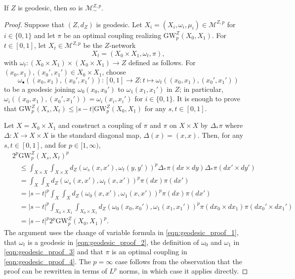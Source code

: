 \documentclass[twoside,11pt]{article}
\theoremstyle{definition}
\newcommand{\M}{\mathcal{M}}
\newcommand{\MZp}{\M_{\sim}^{Z,p}}
\newcommand{\dgwz}{\mathrm{GW}_p^Z}
\begin{document}
\begin{theorem}\label{thm:geodesic}
    If $Z$ is geodesic, then so is $\MZp$.
\end{theorem}
\begin{proof}
    Suppose that $(Z,d_Z)$ is geodesic. Let $X_i = (X_i,\omega_i,\mu_i) \in \M^{Z,p}$ for $i \in \{0,1\}$ and let $\pi$ be an optimal coupling realizing $\dgwz(X_0,X_1)$. For $t \in [0,1]$, let $X_t \in \M^{Z,p}$ be the $Z$-network
    \[
        X_t = (X_0 \times X_1, \omega_t, \pi),
    \]
    with $\omega_t:(X_0 \times X_1) \times (X_0 \times X_1) \to Z$ defined as follows. For $(x_0,x_1),(x_0',x_1') \in X_0 \times X_1$, choose
    \[
        \omega_\bullet ((x_0,x_1),(x_0',x_1')): [0,1] \to Z: t \mapsto \omega_t ((x_0,x_1),(x_0',x_1'))
    \]
    to be a geodesic joining $\omega_0(x_0,x_0')$ to $\omega_1(x_1,x_1')$ in $Z$; in particular, $\omega_i((x_0,x_1),(x_0',x_1')) = \omega_i(x_i,x_i')$ for $i \in \{0,1\}$. It is enough to prove that $\dgwz(X_s,X_t)\leq |s-t|\dgwz(X_0,X_1)$ for any $s,t\in [0,1]$. 
    
    


    Let $X = X_0\times X_1$ and construct a coupling of $\pi$ and $\pi$ on $X\times X$ by $\Delta_* \pi $ where $\Delta: X\to X\times X$ is the standard diagonal map, $\Delta(x)=(x,x)$. Then, for any $s,t\in [0,1]$, and for $p \in [1,\infty)$,
    \begin{align}
        &2^p\dgwz(X_s, X_t)^p \\
        &\quad \leq \int_{X\times X}\int_{X\times X}d_Z(\omega_s(x,x'), \omega_t(y,y'))^p\Delta_*\pi(dx\times dy)\Delta_*\pi(dx'\times dy')                      \\ &\quad= \int_{X}\int_{X}d_Z(\omega_s(x,x'), \omega_t(x,x'))^p\pi(dx) \pi(dx') \label{eqn:geodesic_proof_1} \\
                          &\quad = |s-t|^p\int_{X}\int_{X}d_Z(\omega_0(x,x'),\omega_1(x,x'))^p \pi(dx)\pi(dx')   \label{eqn:geodesic_proof_2}                                                        \\
                          &\quad =|s-t|^p\int_{X_0\times X_1}\int_{X_0\times X_1}d_Z(\omega_0(x_0,x_0'),\omega_1(x_1,x_1'))^p \pi(dx_0\times dx_1)\pi(dx_0'\times dx_1') \label{eqn:geodesic_proof_3} \\
                          &\quad = |s-t|^p 2^p\dgwz(X_0,X_1)^p. \label{eqn:geodesic_proof_4}
    \end{align}
    The argument uses the change of variable formula in \eqref{eqn:geodesic_proof_1}, that $\omega_t$ is a geodesic in \eqref{eqn:geodesic_proof_2}, the definition of $\omega_0$ and $\omega_1$ in \eqref{eqn:geodesic_proof_3} and that $\pi$ is an optimal coupling in \eqref{eqn:geodesic_proof_4}. The $p=\infty$ case follows from the observation that the proof can be rewritten in terms of $L^p$ norms, in which case it applies directly.
\end{proof}
\end{document}
